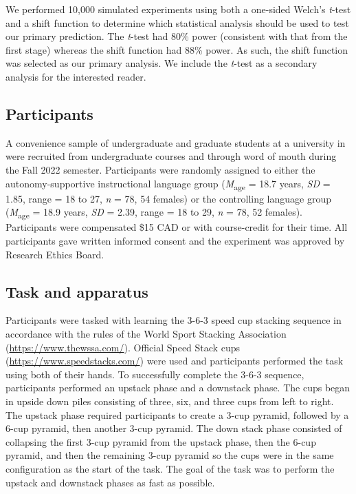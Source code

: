\documentclass[
  man, donotrepeattitle,mask,floatsintext]{apa7}
\begin{document}
We performed 10,000 simulated experiments using both a one-sided Welch's \emph{t}-test and a shift function to determine which statistical analysis should be used to test our primary prediction. The \emph{t}-test had 80\% power (consistent with that from the first stage) whereas the shift function had 88\% power. As such, the shift function was selected as our primary analysis. We include the \emph{t}-test as a secondary analysis for the interested reader.

\hypertarget{participants}{%
\subsection{Participants}\label{participants}}

A convenience sample of undergraduate and graduate students at a university in  were recruited from undergraduate courses and through word of mouth during the Fall 2022 semester. Participants were randomly assigned to either the autonomy-supportive instructional language group (\emph{M}\textsubscript{age} = 18.7 years, \emph{SD} = 1.85, range = 18 to 27, \emph{n} = 78, 54 females) or the controlling language group (\emph{M}\textsubscript{age} = 18.9 years, \emph{SD} = 2.39, range = 18 to 29, \emph{n} = 78, 52 females). Participants were compensated \$15 CAD or with course-credit for their time. All participants gave written informed consent and the experiment was approved by  Research Ethics Board.

\hypertarget{task-and-apparatus}{%
\subsection{Task and apparatus}\label{task-and-apparatus}}

Participants were tasked with learning the 3-6-3 speed cup stacking sequence in accordance with the rules of the World Sport Stacking Association (\url{https://www.thewssa.com/}). Official Speed Stack cups (\url{https://www.speedstacks.com/}) were used and participants performed the task using both of their hands. To successfully complete the 3-6-3 sequence, participants performed an upstack phase and a downstack phase. The cups began in upside down piles consisting of three, six, and three cups from left to right. The upstack phase required participants to create a 3-cup pyramid, followed by a 6-cup pyramid, then another 3-cup pyramid. The down stack phase consisted of collapsing the first 3-cup pyramid from the upstack phase, then the 6-cup pyramid, and then the remaining 3-cup pyramid so the cups were in the same configuration as the start of the task. The goal of the task was to perform the upstack and downstack phases as fast as possible.
\end{document}
